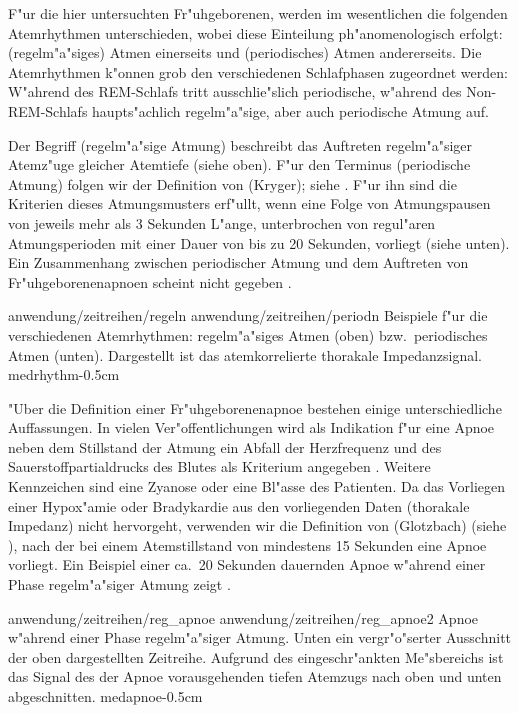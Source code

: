 F"ur die hier untersuchten Fr"uhgeborenen, werden im wesentlichen die
folgenden Atemrhythmen unterschieden, wobei diese Einteilung ph"anomenologisch erfolgt:
\begriff(regelm"a"siges) Atmen einerseits und \begriff(periodisches) Atmen andererseits.
Die Atemrhythmen k"onnen grob den verschiedenen Schlafphasen zugeordnet werden: W"ahrend
des REM-Schlafs tritt ausschlie"slich periodische, w"ahrend des Non-REM-Schlafs
haupts"achlich regelm"a"sige, aber auch periodische Atmung auf.

Der Begriff \begriff(regelm"a"sige Atmung) beschreibt das Auftreten regelm"a"siger
Atemz"uge gleicher Atemtiefe (siehe  oben). F"ur den Terminus
\begriff(periodische Atmung) folgen wir der Definition von \autor(Kryger); siehe \cite{Hoch96}. F"ur ihn sind
die Kriterien dieses Atmungsmusters erf"ullt, wenn eine Folge von Atmungspausen von
jeweils mehr als 3 Sekunden L"ange, unterbrochen von regul"aren Atmungsperioden mit einer
Dauer von bis zu 20 Sekunden, vorliegt (siehe  unten). Ein Zusammenhang
zwischen periodischer Atmung und dem Auftreten von Fr"uhgeborenenapnoen scheint
nicht gegeben \cite{Hoch96}.

\epsfigdouble
{anwendung/zeitreihen/regeln}
{anwendung/zeitreihen/periodn}
{Beispiele f"ur die verschiedenen Atemrhythmen: regelm"a"siges Atmen (oben) bzw.\  
  periodisches Atmen (unten). Dargestellt ist das atemkorrelierte thorakale
  Impedanzsignal.  }{medrhythm}{-0.5cm}

"Uber die Definition einer Fr"uhgeborenenapnoe bestehen einige unterschiedliche
Auffassungen. In vielen Ver"offentlichungen wird als Indikation f"ur eine Apnoe neben dem Stillstand der
Atmung  ein Abfall der Herzfrequenz und des Sauerstoffpartialdrucks des Blutes als
Kriterium angegeben \cite{Poets93}. Weitere Kennzeichen sind eine Zyanose oder eine Bl"asse
des Patienten. Da das Vorliegen einer Hypox"amie oder Bradykardie aus den vorliegenden
Daten (thorakale Impedanz) nicht hervorgeht, verwenden wir die Definition von
\autor(Glotzbach) (siehe \cite{Hoch96}), nach der bei einem Atemstillstand von mindestens 15 Sekunden eine 
Apnoe vorliegt.  Ein Beispiel einer ca.\ 20 Sekunden dauernden Apnoe w"ahrend einer Phase
regelm"a"siger Atmung zeigt \psref{medapnoe}.

\epsfigdouble
{anwendung/zeitreihen/reg_apnoe}
{anwendung/zeitreihen/reg_apnoe2}
{ Apnoe w"ahrend einer Phase regelm"a"siger Atmung. Unten
  ein vergr"o"serter Ausschnitt der oben dargestellten Zeitreihe. Aufgrund des eingeschr"ankten Me"sbereichs ist
  das Signal des der Apnoe vorausgehenden tiefen Atemzugs nach oben und unten abgeschnitten.
}{medapnoe}{-0.5cm}


